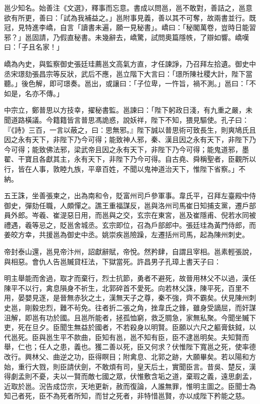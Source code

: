 \begin{pinyinscope}
 邕少知名。始善注《文選》，釋事而忘意。書成以問邕，邕不敢對，善詰之，邕意欲有所更，善曰：「試為我補益之。」邕附事見義，善以其不可奪，故兩書並行。既冠，見特進李嶠，自言「讀書未遍，願一見秘書」。嶠曰：「秘閣萬卷，豈時日能習邪？」邕固請，乃假直秘書。未幾辭去，嶠驚，試問奧篇隱帙，了辯如響。嶠嘆曰：「子且名家！」



 嶠為內史，與監察御史張廷珪薦邕文高氣方直，才任諫諍，乃召拜左拾遺。御史中丞宋璟劾張昌宗等反狀，武后不應，邕立階下大言曰：「璟所陳社稷大計，陛下當聽。」後色解，即可璟奏。邕出，或讓曰：「子位卑，一忤旨，禍不測。」邕曰：「不如是，名亦不傳。」



 中宗立，鄭普思以方技幸，擢秘書監。邕諫曰：「陛下躬政日淺，有九重之嚴，未聞道路橫議。今籍籍皆言普思馮詭惑，說妖祥，陛下不知，猥見驅使。孔子曰：『《詩》三百，一言以蔽之，曰：思無邪。』陛下誠以普思術可致長生，則爽鳩氏且因之永有天下，非陛下乃今可得；能致神人邪，秦、漢且因之永有天下，非陛下乃今可得；能致佛法邪，梁武帝且因之永有天下，非陛下乃今可得；能鬼道邪，墨翟、干寶且各獻其主，永有天下，非陛下乃今可得。自古堯、舜稱聖者，臣觀所以行，皆在人事，敦睦九族，平章百姓，不聞以鬼神道治天下，惟陛下省察。」不納。



 五王誅，坐善張柬之，出為南和令，貶富州司戶參軍事。韋氏平，召拜左臺殿中侍御史，彈劾任職，人頗憚之。譙王重福謀反，邕與洛州司馬崔日知捕支黨，遷戶部員外郎。岑羲、崔湜惡日用，而邕與之交，玄宗在東宮，邕及崔隱甫、倪若水同被禮遇，羲等忌之，貶邕舍城丞。玄宗即位，召為戶部郎中。張廷珪為黃門侍郎，而姜皎方幸，共援邕為御史中丞。姚崇疾邕險躁，左遷括州司馬，起為陳州刺史。



 帝封泰山還，邕見帝汴州，詔獻辭賦，帝悅。然矜肆，自謂且宰相。邕素輕張說，與相惡。會仇人告邕贓貸枉法，下獄當死。許昌男子孔璋上書天子曰：



 明主舉能而舍過，取才而棄行，烈士抗節，勇者不避死，故晉用林父不以過，漢任陳平不以行，禽息隕身不祈生，北郭碎首不愛死。向若林父誅，陳平死，百里不用，晏嬰見逐，是晉無赤狄之土，漢無天子之尊，秦不強，齊不霸矣。伏見陳州刺史邕，剛毅忠烈，難不茍免。往者折二張之角，挫韋氏之鋒，雖身受謫屈，而奸謀沮解，即邕有功於國。且邕所能者，拯孤恤窮，救乏賙急，家無私聚。今聞坐贓下吏，死在旦夕。臣聞生無益於國者，不若殺身以明賢。臣願以六尺之軀膏鈇鉞，以代邕死。臣與邕生平不款曲，臣知有邕，邕不知有臣，臣不逮邕明矣。夫知賢而舉，仁也；任人之患，義也。獲二善以死，臣又何求？伏惟陛下寬邕之死，使率德改行。興林父、曲逆之功，臣得瞑目；附禽息、北郭之跡，大願畢矣。若以陽和方始，重行大戮，則臣請伏劍，不敢煩有司，皇天后土，實聞臣言。昔吳、楚反，漢得劇孟則不憂，夫以一賢而敵七國之眾，伏惟敷含垢之道，棄瑕之義，遠思劇孟，近取於邕。況告成岱宗，天地更新，赦而復論，人誰無罪，惟明主圖之。臣聞士為知己者死，臣不為死者所知，而甘之死者，非特惜邕賢，亦以成陛下矜能之慈。




\end{pinyinscope}
